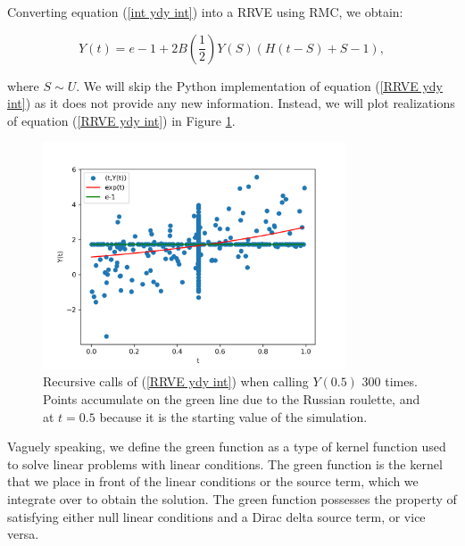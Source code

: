 \documentclass[a4paper,12pt]{article}
\begin{document}
\begin{example}[$y'=y$ average condition]
    Converting equation (\ref{int ydy int}) into a RRVE
    using RMC, we obtain:

    \begin{equation}\label{RRVE ydy int}
        Y(t) = e - 1 + 2B\left(\frac{1}{2}\right)Y(S)(H(t-S)+S-1),
    \end{equation}

    where $S \sim U$. We will skip the Python implementation
    of equation (\ref{RRVE ydy int}) as it does not provide any
    new information. Instead, we will plot realizations of
    equation (\ref{RRVE ydy int}) in Figure \ref{fig:ydy int}.

    \begin{figure}[h!]
        \centering
        \includegraphics[width=0.8\textwidth]{plots/ydy int.png}
        \caption{Recursive calls of (\ref{RRVE ydy int}) when
            calling $Y(0.5)$ $300$ times. Points accumulate on
            the green line due to the Russian roulette,
            and at  $t=0.5$ because it is the starting
            value of the simulation.
        }
        \label{fig:ydy int}
    \end{figure}

\end{example}

\begin{definition}
    Vaguely speaking, we define the green function as a type
    of kernel function used to solve linear problems with linear
    conditions. The green function is the kernel that we
    place in front of the linear conditions or the source term,
    which we integrate over to obtain the solution. The green
    function possesses the property of satisfying either null
    linear conditions and a Dirac delta source term, or vice versa.
\end{definition}
\end{document}
